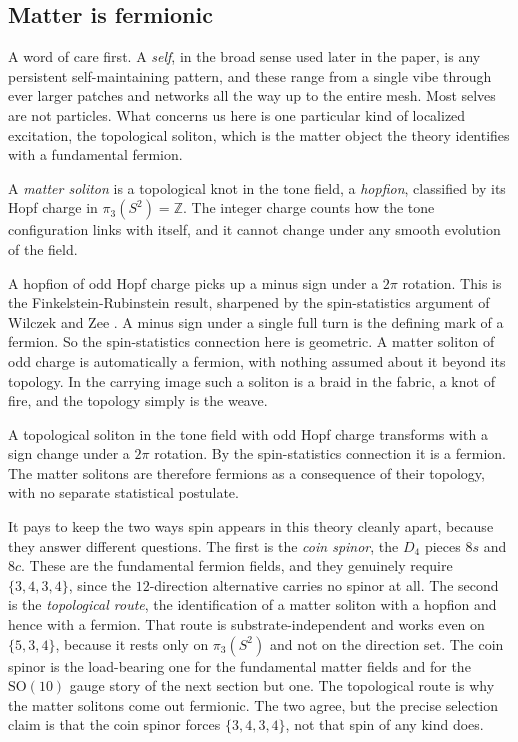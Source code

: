 \subsection{Matter is fermionic}

A word of care first. A \emph{self}, in the broad sense used later in the paper, is any persistent
self-maintaining pattern, and these range from a single vibe through ever larger patches and networks all the way
up to the entire mesh. Most selves are not particles. What concerns us here is one particular kind of localized
excitation, the topological soliton, which is the matter object the theory identifies with a fundamental fermion.

\begin{definition}
A \emph{matter soliton} is a topological knot in the tone field, a \emph{hopfion}, classified by its Hopf charge
in $\pi_3(S^2) = \mathbb{Z}$. The integer charge counts how the tone configuration links with itself, and it
cannot change under any smooth evolution of the field.
\end{definition}

A hopfion of odd Hopf charge picks up a minus sign under a $2\pi$ rotation. This is the Finkelstein-Rubinstein
result, sharpened by the spin-statistics argument of Wilczek and Zee \cite{finkelsteinrubinstein1968,
wilczekzee1983}. A minus sign under a single full turn is the defining mark of a fermion. So the spin-statistics
connection here is geometric. A matter soliton of odd charge is automatically a fermion, with nothing assumed
about it beyond its topology. In the carrying image such a soliton is a braid in the fabric, a knot of fire, and
the topology simply is the weave.

\begin{proposition}
A topological soliton in the tone field with odd Hopf charge transforms with a sign change under a $2\pi$
rotation. By the spin-statistics connection it is a fermion. The matter solitons are therefore fermions as a
consequence of their topology, with no separate statistical postulate.
\end{proposition}

It pays to keep the two ways spin appears in this theory cleanly apart, because they answer different questions.
The first is the \emph{coin spinor}, the $D_4$ pieces $8s$ and $8c$. These are the fundamental fermion fields,
and they genuinely require $\{3,4,3,4\}$, since the $12$-direction alternative carries no spinor at all. The
second is the \emph{topological route}, the identification of a matter soliton with a hopfion and hence with a
fermion. That route is substrate-independent and works even on $\{5,3,4\}$, because it rests only on $\pi_3(S^2)$
and not on the direction set. The coin spinor is the load-bearing one for the fundamental matter fields and for
the $\mathrm{SO}(10)$ gauge story of the next section but one. The topological route is why the matter solitons
come out fermionic. The two agree, but the precise selection claim is that the coin spinor forces $\{3,4,3,4\}$, not that
spin of any kind does.

